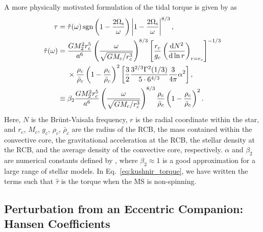 \documentclass[
        fleqn,
        usenatbib,
    ]{mnras}
\newcommand*{\rd}[2]{\frac{\mathrm{d}#1}{\mathrm{d}#2}}
\newcommand*{\abs}[1]{\left|#1\right|}
\newcommand*{\p}[1]{\left(#1\right)}
\newcommand*{\s}[1]{\left[#1\right]}
\DeclareMathOperator*{\sgn}{sgn}
\begin{document}
A more physically motivated formulation of the tidal torque is given by
\citet{kushnir} as
\begin{align}
    \tau ={}& \hat{\tau}(\omega) \sgn\p{1 - \frac{2\Omega_{\rm s}}{\omega}}
        \abs{1 - \frac{2\Omega_{\rm s}}{\omega}}^{8/3}
            \label{eq:kushnir_torque},\\
    \hat{\tau}(\omega) ={}& \frac{GM_2^2r_c^5}{a^6}
        \p{\frac{\omega}{\sqrt{GM_c/r_c^3}}}^{8/3}
        \s{\frac{r_c}{g_c}\p{\rd{N^2}{\ln r}}_{r = r_c}}^{-1/3}\nonumber\\
            &\times \frac{\rho_c}{\bar{\rho}_c}
                \p{1 - \frac{\rho_c}{\bar{\rho}_c}}^2
                \s{\frac{3}{2}\frac{3^{2/3}\Gamma^2(1/3)}{5 \cdot
                6^{4/3}} \frac{3}{4\pi}\alpha^2},\nonumber\\
        \equiv{}& \beta_2\frac{GM_2^2r_c^5}{a^6}
            \p{\frac{\omega}{\sqrt{GM_c/r_c^3}}}^{8/3}
            \frac{\rho_c}{\bar{\rho}_c} \p{1 - \frac{\rho_c}{\bar{\rho}_c}}^2.
\end{align}
Here, $N$ is the Br\"unt-Vaisala frequency, $r$ is the radial coordinate within
the star, and $r_c$, $M_c$, $g_c$, $\rho_c$, $\bar{\rho}_c$ are the radius of
the RCB, the mass contained within the convective core, the gravitational
acceleration at the RCB, the stellar density at the RCB, and the average density
of the convective core, respectively. $\alpha$ and $\beta_2$ are numerical
constants defined by \citet{kushnir}, where $\beta_2 \approx 1$ is a good
approximation for a large range of stellar models. In
Eq.~\eqref{eq:kushnir_torque}, we have written the terms such that $\hat{\tau}$
is the torque when the MS is non-spinning.

\subsection{Perturbation from an Eccentric Companion: Hansen Coefficients}
\end{document}

